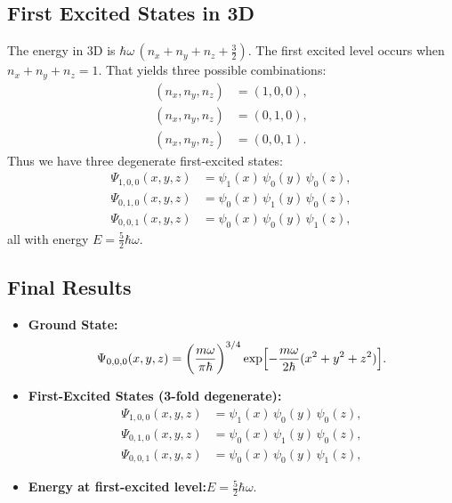 \documentclass[12pt]{article}
\begin{document}
\subsection*{First Excited States in 3D}
\noindent
The energy in 3D is \(\hbar\omega\,(n_x + n_y + n_z + \tfrac32)\). The first excited level occurs when \(n_x + n_y + n_z = 1\). That yields three possible combinations:
\begin{align*}
(n_x,n_y,n_z)&=(1,0,0),\\
(n_x,n_y,n_z)&=(0,1,0),\\
(n_x,n_y,n_z)&=(0,0,1).
\end{align*}
Thus we have three degenerate first-excited states:
\begin{align*}
\Psi_{1,0,0}(x,y,z) &= \psi_1(x)\,\psi_0(y)\,\psi_0(z),\\
\Psi_{0,1,0}(x,y,z) &= \psi_0(x)\,\psi_1(y)\,\psi_0(z),\\
\Psi_{0,0,1}(x,y,z) &= \psi_0(x)\,\psi_0(y)\,\psi_1(z),
\end{align*}
all with energy \(E = \tfrac{5}{2}\hbar\omega\).

\subsection*{Final Results}
\begin{itemize}
\item \textbf{Ground State:}
\begin{equation}
\Psi_{0,0,0}(x,y,z) = \biggl(\frac{m\omega}{\pi\hbar}\biggr)^{3/4}\exp\Bigl[-\frac{m\omega}{2\hbar}(x^2 + y^2 + z^2)\Bigr].
\end{equation}
\item \textbf{First-Excited States (3-fold degenerate):}
\begin{align*}
\Psi_{1,0,0}(x,y,z) &= \psi_1(x)\,\psi_0(y)\,\psi_0(z),\\
\Psi_{0,1,0}(x,y,z) &= \psi_0(x)\,\psi_1(y)\,\psi_0(z),\\
\Psi_{0,0,1}(x,y,z) &= \psi_0(x)\,\psi_0(y)\,\psi_1(z),
\end{align*}
\item \textbf{Energy at first-excited level:}\quad \(E = \frac{5}{2}\hbar\omega.\)
\end{itemize}
\end{document}
